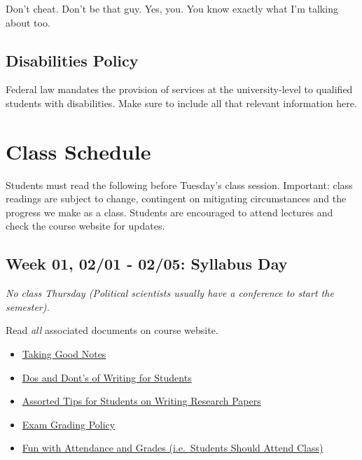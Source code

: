 \documentclass[]{article}
\providecommand{\tightlist}{%
  \setlength{\itemsep}{0pt}\setlength{\parskip}{0pt}}
\begin{document}
Don't cheat. Don't be that guy. Yes, you. You know exactly what I'm
talking about too.

\subsection{Disabilities Policy}\label{disabilities-policy}

Federal law mandates the provision of services at the university-level
to qualified students with disabilities. Make sure to include all that
relevant information here.

\newpage

\section{Class Schedule}\label{class-schedule}

Students must read the following before Tuesday's class session.
Important: class readings are subject to change, contingent on
mitigating circumstances and the progress we make as a class. Students
are encouraged to attend lectures and check the course website for
updates.

\subsection{Week 01, 02/01 - 02/05: Syllabus
Day}\label{week-01-0201---0205-syllabus-day}

\emph{No class Thursday (Political scientists usually have a conference
to start the semester).}

Read \emph{all} associated documents on course website.

\begin{itemize}
\tightlist
\item
  \href{http://svmiller.com/blog/2014/09/taking-good-notes/}{Taking Good
  Notes}
\item
  \href{http://svmiller.com/blog/2015/06/dos-and-donts-of-writing-for-students/}{Dos
  and Dont's of Writing for Students}
\item
  \href{http://svmiller.com/blog/2015/12/assorted-tips-students-research-papers/}{Assorted
  Tips for Students on Writing Research Papers}
\item
  \href{https://www.dropbox.com/s/apihjs7di81aqcv/svm-exam-grading-policy.pdf?dl=0}{Exam
  Grading Policy}
\item
  \href{http://svmiller.com/blog/2016/05/fun-with-attendance-grades/}{Fun
  with Attendance and Grades (i.e.~Students Should Attend Class)}
\end{itemize}
\end{document}
